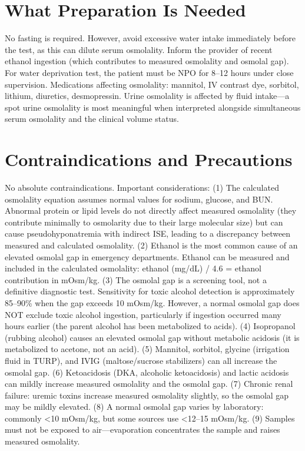 \section*{What Preparation Is Needed}
No fasting is required. However, avoid excessive water intake immediately before the test, as this can dilute serum osmolality. Inform the provider of recent ethanol ingestion (which contributes to measured osmolality and osmolal gap). For water deprivation test, the patient must be NPO for 8--12 hours under close supervision. Medications affecting osmolality: mannitol, IV contrast dye, sorbitol, lithium, diuretics, desmopressin. Urine osmolality is affected by fluid intake---a spot urine osmolality is most meaningful when interpreted alongside simultaneous serum osmolality and the clinical volume status.

\section*{Contraindications and Precautions}
No absolute contraindications. Important considerations: (1) The calculated osmolality equation assumes normal values for sodium, glucose, and BUN. Abnormal protein or lipid levels do not directly affect measured osmolality (they contribute minimally to osmolarity due to their large molecular size) but can cause pseudohyponatremia with indirect ISE, leading to a discrepancy between measured and calculated osmolality. (2) Ethanol is the most common cause of an elevated osmolal gap in emergency departments. Ethanol can be measured and included in the calculated osmolality: ethanol (mg/dL) / 4.6 = ethanol contribution in mOsm/kg. (3) The osmolal gap is a screening tool, not a definitive diagnostic test. Sensitivity for toxic alcohol detection is approximately 85--90\% when the gap exceeds 10 mOsm/kg. However, a normal osmolal gap does NOT exclude toxic alcohol ingestion, particularly if ingestion occurred many hours earlier (the parent alcohol has been metabolized to acids). (4) Isopropanol (rubbing alcohol) causes an elevated osmolal gap without metabolic acidosis (it is metabolized to acetone, not an acid). (5) Mannitol, sorbitol, glycine (irrigation fluid in TURP), and IVIG (maltose/sucrose stabilizers) can all increase the osmolal gap. (6) Ketoacidosis (DKA, alcoholic ketoacidosis) and lactic acidosis can mildly increase measured osmolality and the osmolal gap. (7) Chronic renal failure: uremic toxins increase measured osmolality slightly, so the osmolal gap may be mildly elevated. (8) A normal osmolal gap varies by laboratory: commonly <10 mOsm/kg, but some sources use <12--15 mOsm/kg. (9) Samples must not be exposed to air---evaporation concentrates the sample and raises measured osmolality.


